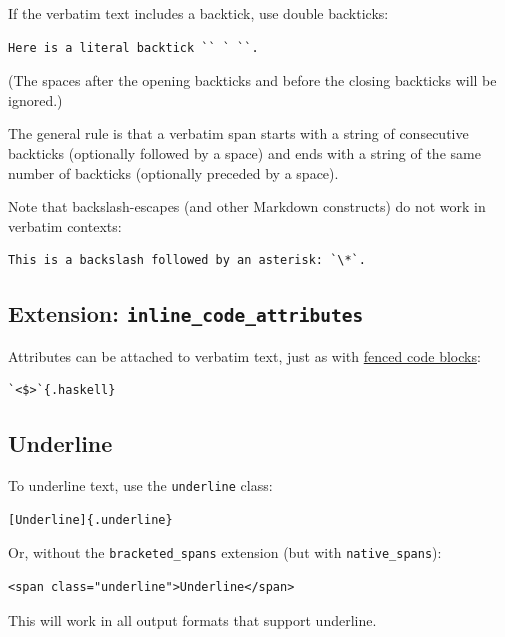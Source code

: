 \documentclass[
  b5paper
]{book}
\begin{document}
If the verbatim text includes a backtick, use double backticks:

\begin{verbatim}
Here is a literal backtick `` ` ``.
\end{verbatim}

(The spaces after the opening backticks and before the closing backticks
will be ignored.)

The general rule is that a verbatim span starts with a string of
consecutive backticks (optionally followed by a space) and ends with a
string of the same number of backticks (optionally preceded by a space).

Note that backslash-escapes (and other Markdown constructs) do not work
in verbatim contexts:

\begin{verbatim}
This is a backslash followed by an asterisk: `\*`.
\end{verbatim}

\subsection{\texorpdfstring{Extension:
\texttt{inline\_code\_attributes}}{Extension: inline\_code\_attributes}}\label{extension-inline_code_attributes}

Attributes can be attached to verbatim text, just as with
\hyperref[fenced-code-blocks]{fenced code blocks}:

\begin{verbatim}
`<$>`{.haskell}
\end{verbatim}

\subsection{Underline}\label{underline}

To underline text, use the \texttt{underline} class:

\begin{verbatim}
[Underline]{.underline}
\end{verbatim}

Or, without the \texttt{bracketed\_spans} extension (but with
\texttt{native\_spans}):

\begin{verbatim}
<span class="underline">Underline</span>
\end{verbatim}

This will work in all output formats that support underline.
\end{document}
